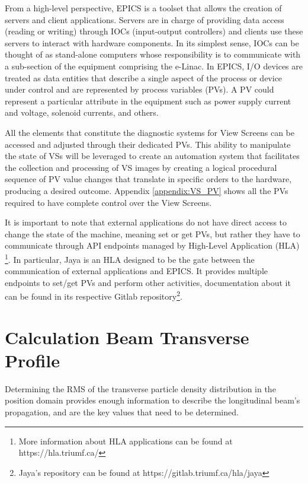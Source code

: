 \documentclass{article}
\begin{document}
From a high-level perspective, EPICS is a toolset that allows the creation of servers and client applications. Servers are in charge of providing data access (reading or writing) through IOCs (input-output controllers) and clients use these servers to interact with hardware components. In its simplest sense, IOCs can be thought of as stand-alone computers whose responsibility is to communicate with a sub-section of the equipment comprising the e-Linac. In EPICS, I/O devices are treated as data entities that describe a single aspect of the process or device under control and are represented by process variables (PVs). A PV could represent a particular attribute in the equipment such as power supply current and voltage, solenoid currents, and others.

All the elements that constitute the diagnostic systems for View Screens can be accessed and adjusted through their dedicated PVs. This ability to manipulate the state of VSs will be leveraged to create an automation system that facilitates the collection and processing of VS images by creating a logical procedural sequence of PV value changes that translate in specific orders to the hardware, producing a desired outcome. Appendix \ref{appendix:VS_PV} shows all the PVs required to have complete control over the View Screens.
     
It is important to note that external applications do not have direct access to change the state of the machine, meaning set or get PVs, but rather they have to communicate through API endpoints managed by High-Level Application (HLA) \footnote{More information about HLA applications can be found at https://hla.triumf.ca/}. In particular, Jaya is an HLA designed to be the gate between the communication of external applications and EPICS. It provides multiple endpoints to set/get PVs and perform other activities, documentation about it can be found in its respective Gitlab repository\footnote{ Jaya's repository can be found at https://gitlab.triumf.ca/hla/jaya}.  

\section{Calculation Beam Transverse Profile}

Determining the RMS of the transverse particle density distribution in the position domain provides enough information to describe the longitudinal beam's propagation, and are the key values that need to be determined.
    
\end{document}
